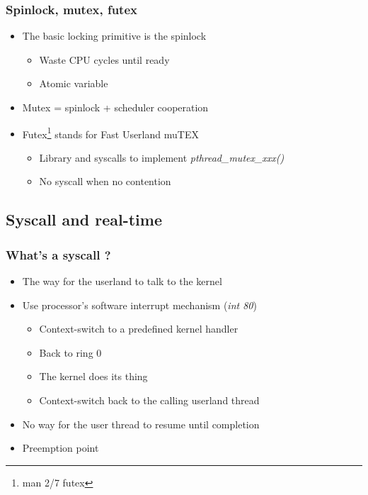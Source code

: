 \begin{frame}
  \frametitle{Spinlock, mutex, futex}

  \begin{itemize}
  \item The basic locking primitive is the spinlock
    \begin{itemize}
    \item Waste CPU cycles until ready
    \item Atomic variable
    \end{itemize}
  \item Mutex = spinlock + scheduler cooperation
  \item Futex\footnote{man 2/7 futex} stands for Fast Userland muTEX
    \begin{itemize}
    \item Library and syscalls to implement \emph{pthread\_mutex\_xxx()}
    \item No syscall when no contention
    \end{itemize}
  \end{itemize}
\end{frame}

\subsection{Syscall and real-time}
\label{subsec:rt}


\begin{frame}
  \frametitle{What's a syscall ?}

  \begin{itemize}
  \item The way for the userland to talk to the kernel
  \item Use processor's software interrupt mechanism (\emph{int 80})
    \begin{itemize}
    \item Context-switch to a predefined kernel handler
    \item Back to ring 0
    \item The kernel does its thing
    \item Context-switch back to the calling userland thread
    \end{itemize}
  \item No way for the user thread to resume until completion
  \item Preemption point
  \end{itemize}
\end{frame}

